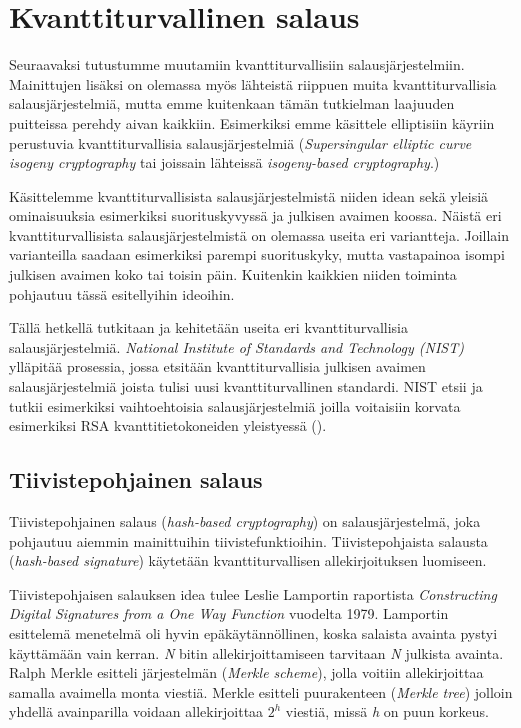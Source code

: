 \chapter{Kvanttiturvallinen salaus\label{results}}

Seuraavaksi tutustumme muutamiin kvanttiturvallisiin salausjärjestelmiin. Mainittujen lisäksi on olemassa myös lähteistä riippuen muita kvanttiturvallisia salausjärjestelmiä, mutta emme kuitenkaan tämän tutkielman laajuuden puitteissa perehdy aivan kaikkiin. Esimerkiksi emme käsittele elliptisiin käyriin perustuvia kvanttiturvallisia salausjärjestelmiä (\emph{Supersingular elliptic curve isogeny cryptography} tai joissain lähteissä \emph{isogeny-based cryptography}.)


Käsittelemme kvanttiturvallisista salausjärjestelmistä niiden idean sekä yleisiä ominaisuuksia esimerkiksi suorituskyvyssä ja julkisen avaimen koossa. Näistä eri kvanttiturvallisista salausjärjestelmistä on olemassa useita eri variantteja. Joillain varianteilla saadaan esimerkiksi parempi suorituskyky, mutta vastapainoa isompi julkisen avaimen koko tai toisin päin. Kuitenkin kaikkien niiden toiminta pohjautuu tässä esitellyihin ideoihin.

Tällä hetkellä tutkitaan ja kehitetään useita eri kvanttiturvallisia salausjärjestelmiä. \emph{National Institute of Standards and Technology (NIST)} ylläpitää prosessia, jossa etsitään kvanttiturvallisia julkisen avaimen salausjärjestelmiä joista tulisi uusi kvanttiturvallinen standardi. NIST etsii ja tutkii esimerkiksi vaihtoehtoisia salausjärjestelmiä joilla voitaisiin korvata esimerkiksi RSA kvanttitietokoneiden yleistyessä (\cite{alagic2020status}).

\section{Tiivistepohjainen salaus}
Tiivistepohjainen salaus (\emph{hash-based cryptography}) on salausjärjestelmä, joka pohjautuu aiemmin mainittuihin tiivistefunktioihin. Tiivistepohjaista salausta (\emph{hash-based signature}) käytetään kvanttiturvallisen allekirjoituksen luomiseen.

Tiivistepohjaisen salauksen idea tulee Leslie Lamportin raportista \emph{Constructing Digital Signatures from a One Way Function} vuodelta 1979. Lamportin esittelemä menetelmä oli hyvin epäkäytännöllinen, koska salaista avainta pystyi käyttämään vain kerran. \emph{N} bitin allekirjoittamiseen tarvitaan \emph{N} julkista avainta. Ralph Merkle esitteli järjestelmän (\emph{Merkle scheme}), jolla voitiin allekirjoittaa samalla avaimella monta viestiä. Merkle esitteli puurakenteen (\emph{Merkle tree}) jolloin yhdellä avainparilla voidaan allekirjoittaa $2^{h}$ viestiä, missä \emph{h} on puun korkeus.

